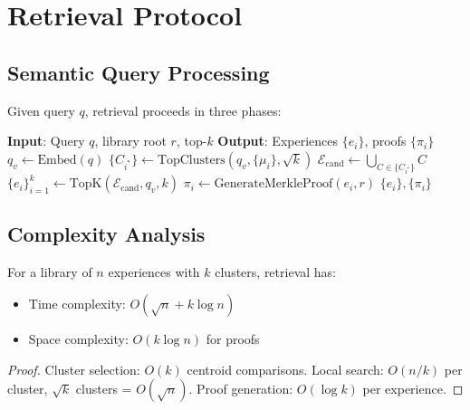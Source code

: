 \section{Retrieval Protocol}

\label{sec:retrieval}

\subsection{Semantic Query Processing}

Given query $q$, retrieval proceeds in three phases:

\begin{algorithm}[t]
\caption{Experience Retrieval with Proof}
\label{alg:retrieval}
\begin{algorithmic}[1]
\STATE \textbf{Input}: Query $q$, library root $r$, top-$k$
\STATE \textbf{Output}: Experiences $\{e_i\}$, proofs $\{\pi_i\}$
\STATE {}
\STATE $q_v \leftarrow \text{Embed}(q)$
\STATE $\{C_{i^*}\} \leftarrow \text{TopClusters}(q_v, \{\mu_i\}, \sqrt{k})$
\STATE {}
\STATE $\mathcal{E}_{\text{cand}} \leftarrow \bigcup_{C \in \{C_{i^*}\}} C$
\STATE $\{e_i\}_{i=1}^k \leftarrow \text{TopK}(\mathcal{E}_{\text{cand}}, q_v, k)$
\STATE {}
    \STATE $\pi_i \leftarrow \text{GenerateMerkleProof}(e_i, r)$
\ENDFOR
\RETURN $\{e_i\}, \{\pi_i\}$
\end{algorithmic}
\end{algorithm}

\subsection{Complexity Analysis}

\begin{theorem}
For a library of $n$ experiences with $k$ clusters, retrieval has:
\begin{itemize}
    \item Time complexity: $O(\sqrt{n} + k \log n)$
    \item Space complexity: $O(k \log n)$ for proofs
\end{itemize}
\end{theorem}

\begin{proof}
Cluster selection: $O(k)$ centroid comparisons. Local search: $O(n/k)$ per cluster, $\sqrt{k}$ clusters = $O(\sqrt{n})$. Proof generation: $O(\log k)$ per experience.
\end{proof}

